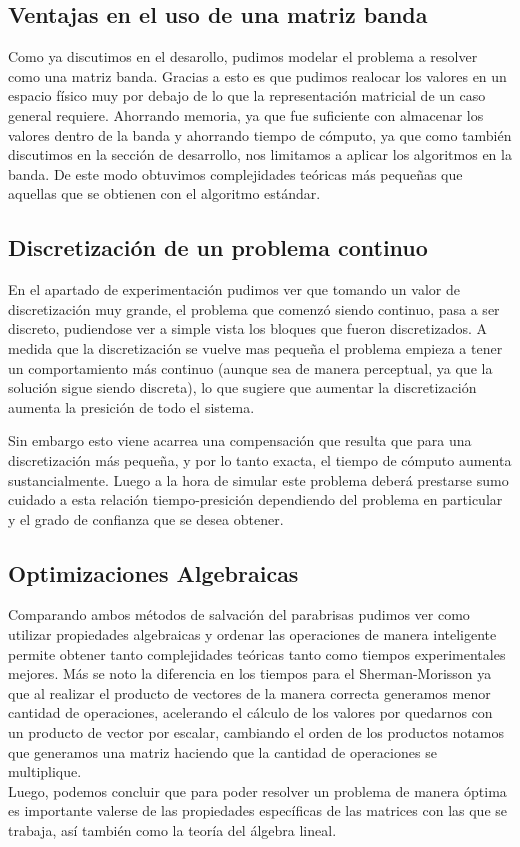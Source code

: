 \subsection{Ventajas en el uso de una matriz banda}

Como ya discutimos en el desarollo, pudimos modelar el problema a resolver como una matriz banda. Gracias a esto es que pudimos realocar los valores en un espacio físico muy por debajo de lo que la representación matricial de un caso general requiere. Ahorrando memoria, ya que fue suficiente con almacenar los valores dentro de la banda y ahorrando tiempo de cómputo, ya que como también discutimos en la sección de desarrollo, nos limitamos a aplicar los algoritmos en la banda. De este modo obtuvimos complejidades teóricas más pequeñas que aquellas que se obtienen con el algoritmo estándar.

\subsection{Discretización de un problema continuo}

En el apartado de experimentación pudimos ver que tomando un valor de discretización muy grande, el problema que comenzó siendo continuo, pasa a ser discreto, pudiendose ver a simple vista los bloques que fueron discretizados. A medida que la discretización se vuelve mas pequeña el problema empieza a tener un comportamiento más continuo (aunque sea de manera perceptual, ya que la solución sigue siendo discreta), lo que sugiere que aumentar la discretización aumenta la presición de todo el sistema.

Sin embargo esto viene acarrea una compensación que resulta que para una discretización más pequeña, y por lo tanto exacta, el tiempo de cómputo aumenta sustancialmente. Luego a la hora de simular este problema deberá prestarse sumo cuidado a esta relación tiempo-presición dependiendo del problema en particular y el grado de confianza que se desea obtener.

\subsection{Optimizaciones Algebraicas}

Comparando ambos métodos de salvación del parabrisas pudimos ver como utilizar propiedades algebraicas y ordenar las operaciones de manera inteligente permite obtener tanto complejidades teóricas tanto como tiempos experimentales mejores. Más se noto la diferencia en los tiempos para el Sherman-Morisson ya que al realizar el producto de vectores de la manera correcta generamos menor cantidad de operaciones, acelerando el cálculo de los valores por quedarnos con un producto de vector por escalar, cambiando el orden de los productos notamos que generamos una matriz haciendo que la cantidad de operaciones se multiplique.
\\
Luego, podemos concluir que para poder resolver un problema de manera óptima es importante valerse de las propiedades específicas de las matrices con las que se trabaja, así también como la teoría del álgebra lineal.

